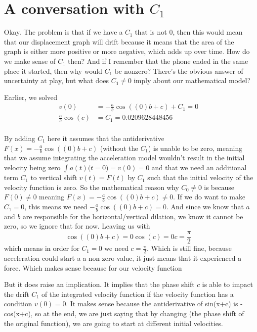 \documentclass[12pt]{article}
\begin{document}
\section{A conversation with $C_{1}$}


Okay. The problem is that if we have a $C_{1}$ that is not 0, then this would mean that our displacement graph will drift because it means that the area of the graph is either more positive or more negative, which adds up over time. How do we make sense of $C_{1}$ then? And if I remember that the phone ended in the same place it started, then why would $C_{1}$ be nonzero? There's the obvious answer of uncertainty at play, but what does $C_{1}\neq 0$ imply about our mathematical model?

Earlier, we solved
\begin{align}
    v(0) &= -\frac{a}{b}\cos(\left(0\right)b+c) + C_{1} = 0 \\
    \frac{a}{b}\cos(c) &= C_{1} = 0.0209628448456 \\
\end{align}

By adding $C_{1}$ here it assumes that the antiderivative $F(x) = -\frac{a}{b}\cos(\left(0\right)b+c)$ (without the $C_{1}$) is unable to be zero, meaning that we assume integrating the acceleration model wouldn't result in the initial velocity being zero $\int a(t)\Big(t=0\Big) = v(0)=0$ and that we need an additional term $C_{1}$ to vertical shift $v(t) = F(t)$ by $C_{1}$ such that the initial velocity of the velocity function is zero.
So the mathematical reason why $C_{0} \neq 0$ is because $F(0)\neq 0$ meaning $F(x) = -\frac{a}{b}\cos(\left(0\right)b+c) \neq 0$. If we do want to make $C_{1} = 0$, this means we need $-\frac{a}{b}\cos(\left(0\right)b+c) = 0$. And since we know that $a$ and $b$ are responsible for the horizontal/vertical dilation, we know it cannot be zero, so we ignore that for now. Leaving us with
\begin{equation}
    \cos(\left(0\right)b+c) = 0
    \cos(c) = 0
    c = \frac{\pi}{2}
\end{equation}
which means in order for $C_{1} = 0$ we need $c=\frac{\pi}{2}$. Which is still fine, because acceleration could start a a non zero value, it just means that it experienced a force. Which makes sense because for our velocity function

But it does raise an implication. It implies that the phase shift $c$ is able to impact the drift $C_{1}$ of the integrated velocity function if the velocity function has a condition $v(0)=0$. It makes sense because the antiderivative of sin(x+c) is -cos(x+c), so at the end, we are just saying that by changing (the phase shift of the original function), we are going to start at different initial velocities.
\end{document}
